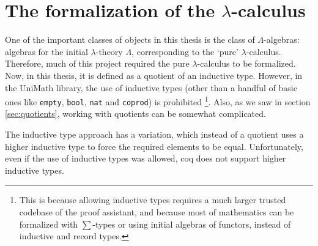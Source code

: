 \section{The formalization of the \texorpdfstring{$ \lambda $}{lambda}-calculus} \label{sec:axiomatic-lambda-calculus}
One of the important classes of objects in this thesis is the class of $ \Lambda $-algebras: algebras for the initial $ \lambda $-theory $ \Lambda $, corresponding to the `pure' $ \lambda $-calculus. Therefore, much of this project required the pure $ \lambda $-calculus to be formalized. Now, in this thesis, it is defined as a quotient of an inductive type. However, in the UniMath library, the use of inductive types (other than a handful of basic ones like \texttt{empty}, \texttt{bool}, \texttt{nat} and \texttt{coprod}) is prohibited
\footnote{This is because allowing inductive types requires a much larger trusted codebase of the proof assistant, and because most of mathematics can be formalized with $ \sum $-types or using initial algebras of functors, instead of inductive and record types.}. Also, as we saw in section \ref{sec:quotients}, working with quotients can be somewhat complicated.

The inductive type approach has a variation, which instead of a quotient uses a higher inductive type to force the required elements to be equal. Unfortunately, even if the use of inductive types was allowed, coq does not support higher inductive types.

